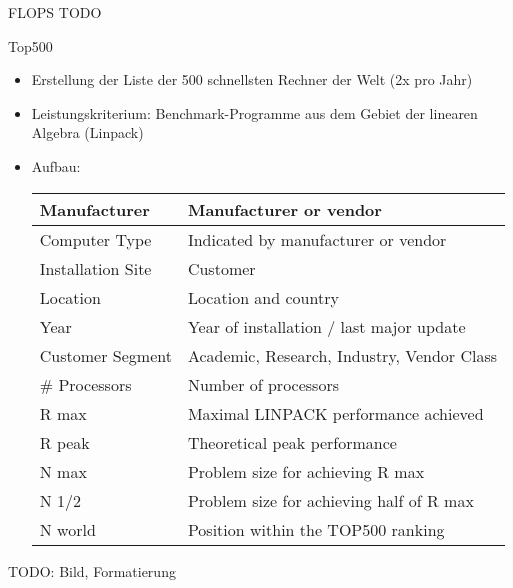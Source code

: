 \begin{example}[Leistungsmaß]{FLOPS}
    TODO
\end{example}

\begin{bonus}{Top500}
    \begin{itemize}
        \item Erstellung der Liste der 500 schnellsten Rechner der Welt (2x pro Jahr)
        \item Leistungskriterium: Benchmark-Programme aus dem Gebiet der linearen Algebra (Linpack)
        \item Aufbau:\\
              \begin{tabular}{|l|l|}
                  \hline
                  Manufacturer      & Manufacturer or vendor                     \\
                  \hline
                  Computer Type     & Indicated by manufacturer or vendor        \\
                  \hline
                  Installation Site & Customer                                   \\
                  \hline
                  Location          & Location and country                       \\
                  \hline
                  Year              & Year of installation / last major update   \\
                  \hline
                  Customer Segment  & Academic, Research, Industry, Vendor Class \\
                  \hline
                  \# Processors     & Number of processors                       \\
                  \hline
                  R max             & Maximal LINPACK performance achieved       \\
                  \hline
                  R peak            & Theoretical peak performance               \\
                  \hline
                  N max             & Problem size for achieving R max           \\
                  \hline
                  N 1/2             & Problem size for achieving half of R max   \\
                  \hline
                  N world           & Position within the TOP500 ranking         \\
                  \hline
              \end{tabular}
    \end{itemize}
    TODO: Bild, Formatierung
\end{bonus}

